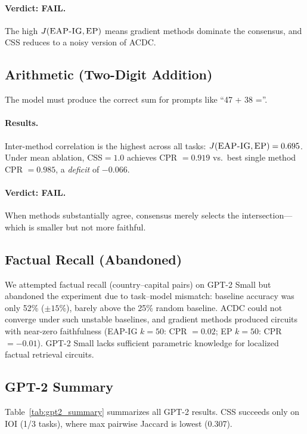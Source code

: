 \documentclass[11pt,a4paper]{article}
\newcommand{\css}{\textsc{CSS}}
\newcommand{\eapig}{\textsc{EAP-IG}}
\newcommand{\ep}{\textsc{EP}}
\newcommand{\acdc}{\textsc{ACDC}}
\begin{document}
\paragraph{Verdict: FAIL.} The high $J(\text{\eapig{}}, \text{\ep{}})$ means gradient methods dominate the consensus, and \css{} reduces to a noisy version of \acdc{}.

\subsection{Arithmetic (Two-Digit Addition)}

The model must produce the correct sum for prompts like ``47 + 38 =''.

\paragraph{Results.}
Inter-method correlation is the highest across all tasks: $J(\text{\eapig{}}, \text{\ep{}}) = 0.695$.
Under mean ablation, \css{}$= 1.0$ achieves CPR $= 0.919$ vs.\ best single method CPR $= 0.985$, a \emph{deficit} of $-0.066$.

\paragraph{Verdict: FAIL.} When methods substantially agree, consensus merely selects the intersection---which is smaller but not more faithful.

\subsection{Factual Recall (Abandoned)}

We attempted factual recall (country--capital pairs) on GPT-2 Small but abandoned the experiment due to task--model mismatch: baseline accuracy was only 52\% ($\pm 15\%$), barely above the 25\% random baseline.
\acdc{} could not converge under such unstable baselines, and gradient methods produced circuits with near-zero faithfulness (\eapig{} $k = 50$: CPR $= 0.02$; \ep{} $k = 50$: CPR $= -0.01$).
GPT-2 Small lacks sufficient parametric knowledge for localized factual retrieval circuits.

\subsection{GPT-2 Summary}

Table~\ref{tab:gpt2_summary} summarizes all GPT-2 results. \css{} succeeds only on IOI (1/3 tasks), where max pairwise Jaccard is lowest (0.307).
\end{document}
